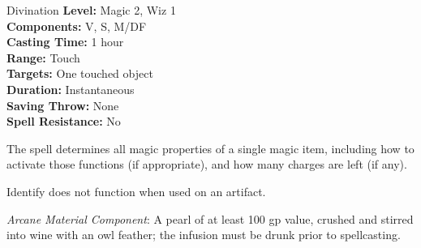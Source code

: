 {Divination}
{
	\textbf{Level:}
	Magic 2, Wiz 1\\
	\textbf{Components:}
	V, S, M/DF\\
	\textbf{Casting Time:}
	1 hour\\
	\textbf{Range:}
	Touch\\
	\textbf{Targets:}
	One touched object\\
	\textbf{Duration:}
	Instantaneous\\
	\textbf{Saving Throw:}
	None\\
	\textbf{Spell Resistance:}
	No\\
}
{
	The spell determines all magic properties of a single magic item, including how to activate those functions (if appropriate), and how many charges are left (if any).

	Identify does not function when used on an artifact.

	\textit{Arcane Material Component}:
	A pearl of at least 100 gp value, crushed and stirred into wine with an owl feather; the infusion must be drunk prior to spellcasting.

}
